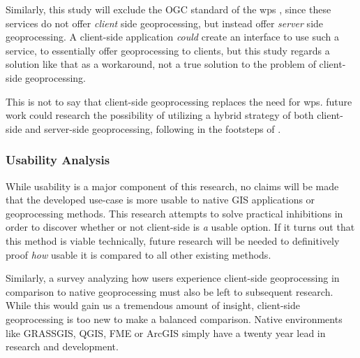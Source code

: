 Similarly, this study will exclude the OGC standard of the \ac{wps} \cite{ogc_web_2015}, since these services do not offer \emph{client} side geoprocessing, but instead offer \emph{server} side geoprocessing. A client-side application \textit{could} create an interface to use such a service, to essentially offer geoprocessing to clients, but this study regards a solution like that as a workaround, not a true solution to the problem of client-side geoprocessing. 

This is not to say that client-side geoprocessing replaces the need for \ac{wps}. 
future work could research the possibility of utilizing a hybrid strategy of both client-side and server-side geoprocessing, following in the footsteps of \cite{panidi_hybrid_2015}. 



\subsubsection*{Usability Analysis} %

While usability is a major component of this research, no claims will be made that the developed use-case is more usable to native GIS applications or geoprocessing methods. This research attempts to solve practical inhibitions in order to discover whether or not client-side is \emph{a} usable option. If it turns out that this method is viable technically, future research will be needed to definitively proof \emph{how} usable it is compared to all other existing methods.  


Similarly, a survey analyzing how users experience client-side geoprocessing in comparison to native geoprocessing must also be left to subsequent research. While this would gain us a tremendous amount of insight, client-side geoprocessing is too new to make a balanced comparison. Native environments like GRASSGIS, QGIS, FME or ArcGIS simply have a twenty year lead in research and development. 
